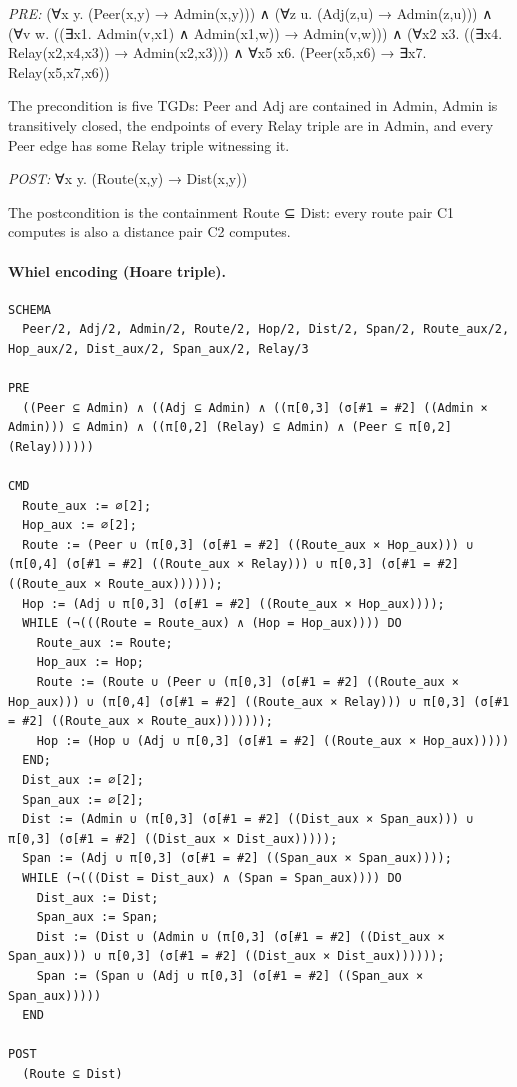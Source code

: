 \documentclass[10pt]{article}
\begin{document}
\textit{PRE:} (∀x y. (Peer(x,y) → Admin(x,y))) ∧ (∀z u. (Adj(z,u) → Admin(z,u))) ∧ (∀v w. ((∃x1. Admin(v,x1) ∧ Admin(x1,w)) → Admin(v,w))) ∧ (∀x2 x3. ((∃x4. Relay(x2,x4,x3)) → Admin(x2,x3))) ∧ ∀x5 x6. (Peer(x5,x6) → ∃x7. Relay(x5,x7,x6))\par The precondition is five TGDs: Peer and Adj are contained in Admin, Admin is transitively closed, the endpoints of every Relay triple are in Admin, and every Peer edge has some Relay triple witnessing it.

\textit{POST:} ∀x y. (Route(x,y) → Dist(x,y))\par The postcondition is the containment Route ⊆ Dist: every route pair C1 computes is also a distance pair C2 computes.

\paragraph{Whiel encoding (Hoare triple).}

\begin{Verbatim}[fontsize=\scriptsize,breaklines=true,breakanywhere=true,frame=single,framesep=1.5mm]
SCHEMA
  Peer/2, Adj/2, Admin/2, Route/2, Hop/2, Dist/2, Span/2, Route_aux/2, Hop_aux/2, Dist_aux/2, Span_aux/2, Relay/3

PRE
  ((Peer ⊆ Admin) ∧ ((Adj ⊆ Admin) ∧ ((π[0,3] (σ[#1 = #2] ((Admin × Admin))) ⊆ Admin) ∧ ((π[0,2] (Relay) ⊆ Admin) ∧ (Peer ⊆ π[0,2] (Relay))))))

CMD
  Route_aux := ∅[2];
  Hop_aux := ∅[2];
  Route := (Peer ∪ (π[0,3] (σ[#1 = #2] ((Route_aux × Hop_aux))) ∪ (π[0,4] (σ[#1 = #2] ((Route_aux × Relay))) ∪ π[0,3] (σ[#1 = #2] ((Route_aux × Route_aux))))));
  Hop := (Adj ∪ π[0,3] (σ[#1 = #2] ((Route_aux × Hop_aux))));
  WHILE (¬(((Route = Route_aux) ∧ (Hop = Hop_aux)))) DO
    Route_aux := Route;
    Hop_aux := Hop;
    Route := (Route ∪ (Peer ∪ (π[0,3] (σ[#1 = #2] ((Route_aux × Hop_aux))) ∪ (π[0,4] (σ[#1 = #2] ((Route_aux × Relay))) ∪ π[0,3] (σ[#1 = #2] ((Route_aux × Route_aux)))))));
    Hop := (Hop ∪ (Adj ∪ π[0,3] (σ[#1 = #2] ((Route_aux × Hop_aux)))))
  END;
  Dist_aux := ∅[2];
  Span_aux := ∅[2];
  Dist := (Admin ∪ (π[0,3] (σ[#1 = #2] ((Dist_aux × Span_aux))) ∪ π[0,3] (σ[#1 = #2] ((Dist_aux × Dist_aux)))));
  Span := (Adj ∪ π[0,3] (σ[#1 = #2] ((Span_aux × Span_aux))));
  WHILE (¬(((Dist = Dist_aux) ∧ (Span = Span_aux)))) DO
    Dist_aux := Dist;
    Span_aux := Span;
    Dist := (Dist ∪ (Admin ∪ (π[0,3] (σ[#1 = #2] ((Dist_aux × Span_aux))) ∪ π[0,3] (σ[#1 = #2] ((Dist_aux × Dist_aux))))));
    Span := (Span ∪ (Adj ∪ π[0,3] (σ[#1 = #2] ((Span_aux × Span_aux)))))
  END

POST
  (Route ⊆ Dist)
\end{Verbatim}
\end{document}
